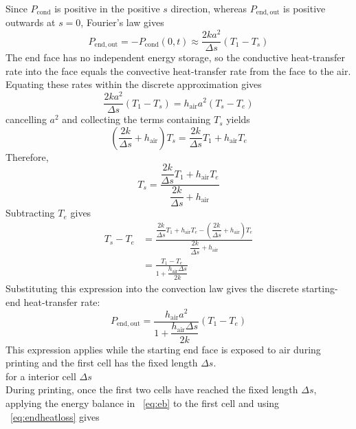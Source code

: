 \documentclass{article}
\begin{document}
Since $P_{\mathrm{cond}}$ is positive in the positive $s$ direction, whereas $P_{\mathrm{end,out}}$ is positive outwards at $s=0$, Fourier's law gives
\begin{equation}
    P_{\mathrm{end,out}}
    =-P_{\mathrm{cond}}(0,t)
    \approx \frac{2ka^2}{\Delta s }(T_1-T_s)
\end{equation}
The end face has no independent energy storage, so the conductive heat-transfer rate into the face equals the convective heat-transfer rate from the face to the air. Equating these rates within the discrete approximation gives 
\begin{equation}
    \frac{2ka^2}{\Delta s}(T_1-T_s)
    =h_{\mathrm{air}}a^2(T_s-T_e)
\end{equation}
cancelling $a^2$ and collecting the terms containing $T_s$ yields
\begin{equation}
    \left(\frac{2k}{\Delta s}+h_{\mathrm{air}}\right)T_s
    =\frac{2k}{\Delta s}T_1+h_{\mathrm{air}}T_e
\end{equation}
Therefore,
\begin{equation}
    T_s=
    \frac{\dfrac{2k}{\Delta s}T_1+h_{\mathrm{air}}T_e}
    {\dfrac{2k}{\Delta s}+h_{\mathrm{air}}}
\end{equation}
Subtracting $T_e$ gives
\begin{equation}
    \begin{aligned}
        T_s-T_e
        &=
        \frac{
        \dfrac{2k}{\Delta s}T_1+h_{\mathrm{air}}T_e
        -\left(\dfrac{2k}{\Delta s}+h_{\mathrm{air}}\right)T_e
        }{
        \dfrac{2k}{\Delta s}+h_{\mathrm{air}}
        }\\
        &=
        \frac{T_1-T_e}
        {1+\dfrac{h_{\mathrm{air}}\Delta s}{2k}}
    \end{aligned}
\end{equation}
Substituting this expression into the convection law gives the discrete starting-end heat-transfer rate:
\begin{equation}
    P_{\mathrm{end,out}}
    =
    \frac{h_{\mathrm{air}}a^2}
    {1+\dfrac{h_{\mathrm{air}}\Delta s}{2k}}
    (T_1-T_e)
    \label{eq:endheatloss}
\end{equation}
This expression applies while the starting end face is exposed to air during printing and the first cell has the fixed length $\Delta s$.
\\for a interior cell $\Delta s$
\\During printing, once the first two cells have reached the fixed length $\Delta s$, applying the energy balance in ~\eqref{eq:eb} to the first cell and using ~\eqref{eq:endheatloss} gives
\end{document}
